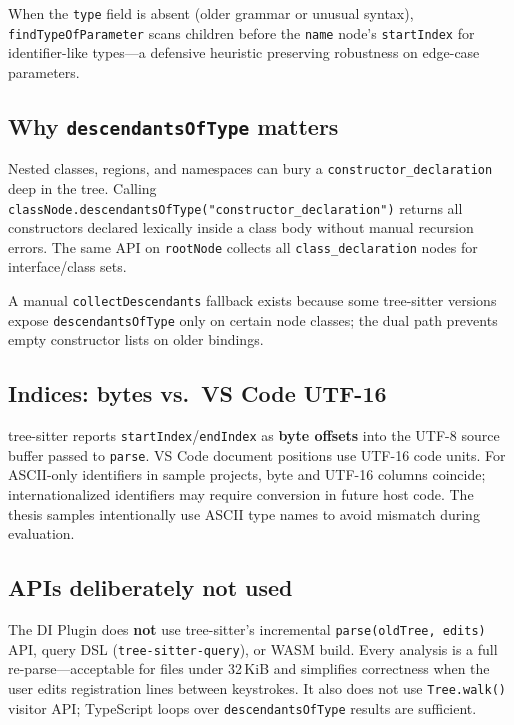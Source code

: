 When the \texttt{type} field is absent (older grammar or unusual syntax), \texttt{findTypeOfParameter} scans children before the \texttt{name} node's \texttt{startIndex} for identifier-like types---a defensive heuristic preserving robustness on edge-case parameters.

\subsection{Why \texttt{descendantsOfType} matters}

Nested classes, regions, and namespaces can bury a \texttt{constructor\_declaration} deep in the tree. Calling \texttt{classNode.descendantsOfType("constructor\_declaration")} returns all constructors declared lexically inside a class body without manual recursion errors. The same API on \texttt{rootNode} collects all \texttt{class\_declaration} nodes for interface/class sets.

A manual \texttt{collectDescendants} fallback exists because some tree-sitter versions expose \texttt{descendantsOfType} only on certain node classes; the dual path prevents empty constructor lists on older bindings.

\subsection{Indices: bytes vs.\ VS Code UTF-16}

tree-sitter reports \texttt{startIndex}/\texttt{endIndex} as \textbf{byte offsets} into the UTF-8 source buffer passed to \texttt{parse}. VS Code document positions use UTF-16 code units. For ASCII-only identifiers in sample projects, byte and UTF-16 columns coincide; internationalized identifiers may require conversion in future host code. The thesis samples intentionally use ASCII type names to avoid mismatch during evaluation.

\subsection{APIs deliberately not used}

The DI Plugin does \textbf{not} use tree-sitter's incremental \texttt{parse(oldTree, edits)} API, query DSL (\texttt{tree-sitter-query}), or WASM build. Every analysis is a full re-parse---acceptable for files under 32\,KiB and simplifies correctness when the user edits registration lines between keystrokes. It also does not use \texttt{Tree.walk()} visitor API; TypeScript loops over \texttt{descendantsOfType} results are sufficient.

